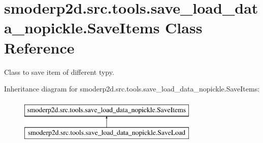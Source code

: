 \hypertarget{classsmoderp2d_1_1src_1_1tools_1_1save__load__data__nopickle_1_1SaveItems}{\section{smoderp2d.\-src.\-tools.\-save\-\_\-load\-\_\-data\-\_\-nopickle.\-Save\-Items Class Reference}
\label{classsmoderp2d_1_1src_1_1tools_1_1save__load__data__nopickle_1_1SaveItems}
}


Class to save item of different typy.  


Inheritance diagram for smoderp2d.\-src.\-tools.\-save\-\_\-load\-\_\-data\-\_\-nopickle.\-Save\-Items\-:\begin{figure}[H]
\begin{center}
\leavevmode
\includegraphics[height=2.000000cm]{d2/dcd/classsmoderp2d_1_1src_1_1tools_1_1save__load__data__nopickle_1_1SaveItems}
\end{center}
\end{figure}
